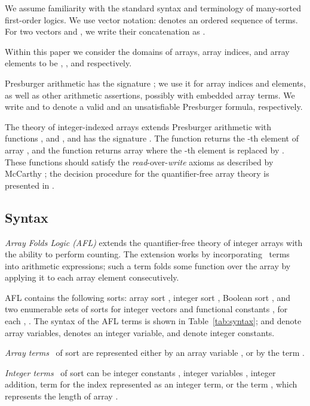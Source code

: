  We assume familiarity with the standard syntax and terminology of many-sorted first-order logics. We use vector notation:  denotes an ordered sequence of terms. For two vectors  and , we write their concatenation as .







Within this paper we consider the domains of arrays, array
indices, and array elements to be ,
, and 
respectively.

Presburger arithmetic has the signature
; we use it for array indices
and elements, as well as other arithmetic assertions, possibly with
embedded array terms.
We write  and  to denote a valid and an unsatisfiable Presburger formula, respectively.

The theory of integer-indexed arrays extends Presburger arithmetic
with functions , and , and has the signature
.
The  function  returns the -th element of array
, and the  function  returns array  where the -th element is replaced by . These functions should satisfy the \emph{read}-over-\emph{write} axioms as described by McCarthy \cite{McCarthy62}; the decision procedure for the quantifier-free array theory is presented in \cite{QuantifierFreeArrays}.


\subsection{Syntax}
\label{afl-syntax}

\emph{Array Folds Logic (AFL)} extends the quantifier-free theory of integer arrays with the ability to perform counting. The extension works by incorporating \Fold\ terms into arithmetic expressions; such a term folds some function over the array by applying it to each array element consecutively.

AFL contains the following sorts: array sort , integer sort , Boolean sort , and two enumerable sets of sorts for integer vectors  and functional constants , for each , . The syntax of the AFL terms is shown in Table~\ref{tab:syntax};  and  denote array variables,  denotes an integer variable,  and  denote integer constants.

\emph{Array terms}~ of sort  are represented either by an array variable , or by the  term .

\emph{Integer terms}~ of sort  can be integer constants , integer variables , integer addition,  term  for the index represented as an integer term, or the term , which represents the length of array . 

